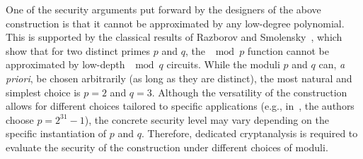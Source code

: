 \documentclass[journal=tosc,submission]{iacrtrans}
\theoremstyle{theorem}
\newcommand\cb[1]{\textcolor{red!80}{\textbf{Christina:} #1}}
\newcommand\yr[1]{\textcolor{brown!80}{\textbf{Yann:} #1}}
\begin{document}
One of the security arguments put forward by the designers of the above construction is that it cannot be approximated by any low-degree polynomial. This is supported by the classical results of Razborov and Smolensky~\cite{Raz87,Smo87}, which show that for two distinct primes $p$ and $q$, the $\mod{p}$ function cannot be approximated by low-depth $\mod{q}$ circuits. %
While the moduli $p$ and $q$ can, \textit{a priori}, be chosen arbitrarily (as long as they are distinct), the most natural and simplest choice is $p = 2$ and $q = 3$. Although the versatility of the construction allows for different choices tailored to specific applications (e.g., in~\cite{TCHES:DMMS21, C:HMMRSU23}, the authors choose $p = 2^{31} - 1$), the concrete security level may vary depending on the specific instantiation of $p$ and $q$. Therefore, dedicated cryptanalysis is required to evaluate the security of the construction under different choices of moduli.


\end{document}
